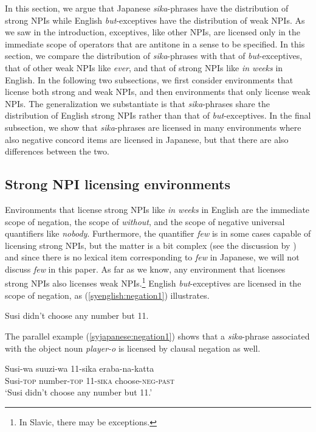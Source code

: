 \documentclass[output=paper]{langscibook}
\begin{document}
In this section, we argue that Japanese \emph{sika}-phrases have the distribution of strong NPIs while English \emph{but}-exceptives have the distribution of weak NPIs. As we  saw in the introduction, exceptives, like other NPIs, are licensed only in the immediate scope of operators that are antitone in a sense to be specified.
In this section, we compare the distribution of \emph{sika}-phrases with that of \emph{but}-exceptives, that of other weak NPIs like \emph{ever}, and that of strong NPIs like \emph{in weeks} in English.
In the following two subsections, we first consider environments that license both strong and weak NPIs, and then environments that only license weak NPIs.
The generalization we substantiate is that \emph{sika}-phrases share the distribution of English strong NPIs rather than that of \emph{but}-exceptives. In the final subsection, we show that \emph{sika}-phrases are licensed in many environments where also negative concord items are licensed in Japanese, but that there are also differences between the two.




\subsection{Strong NPI licensing environments}\largerpage

Environments that license strong NPIs like \emph{in weeks} in English are the immediate scope of negation, the scope of \emph{without}, and the scope of negative universal quantifiers like \emph{nobody}.  Furthermore, the quantifier \emph{few} is in some cases capable of licensing strong NPIs, but the matter is a bit complex (see the discussion by \citealt{chierchia13a}) and since there is no  lexical item corresponding to \emph{few} in Japanese, we will not discuss \emph{few} in this paper. As far as we know, any environment that licenses strong NPIs also licenses weak NPIs.\footnote{In Slavic, there may be exceptions.}  English \emph{but}-exceptives are licensed in the scope of negation, as (\ref{syenglish:negation1}) illustrates.

\ea \label{syenglish:negation1}
Susi didn't choose any number but 11.\z

The parallel example (\ref{syjapanese:negation1}) shows that a \emph{sika}-phrase associated with the object noun \emph{player-o} is licensed by clausal negation as well.  

\ea \label{syjapanese:negation1}
\gll Susi-wa suuzi-wa 11-sika eraba-na-katta\\
     Susi-\textsc{top} number-\textsc{top} 11-\textsc{sika} choose-\textsc{neg}-\textsc{past}\\
\glt `Susi didn't choose any number but 11.'\z
\end{document}
